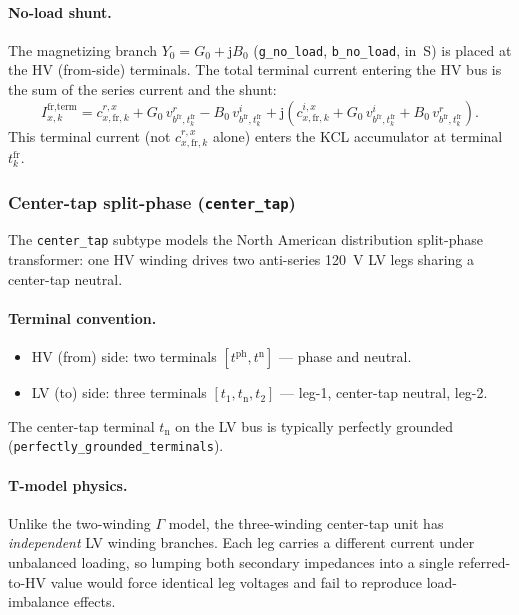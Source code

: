 \documentclass[11pt,a4paper]{article}
\newcommand{\vr}[2]{v^r_{#1,#2}}
\newcommand{\vi}[2]{v^i_{#1,#2}}
\begin{document}
\paragraph{No-load shunt.}
The magnetizing branch $Y_0 = G_0 + \mathrm{j}B_0$
(\texttt{g\_no\_load}, \texttt{b\_no\_load}, in~S) is placed at the HV
(from-side) terminals.  The total terminal current entering the HV bus
is the sum of the series current and the shunt:
%
\begin{equation}
  I^\text{fr,term}_{x,k} = c^{r,x}_{x,\text{fr},k}
    + G_0\,\vr{b^\text{fr}}{t^\text{fr}_k}
    - B_0\,\vi{b^\text{fr}}{t^\text{fr}_k}
    + \mathrm{j}\!\left(c^{i,x}_{x,\text{fr},k}
    + G_0\,\vi{b^\text{fr}}{t^\text{fr}_k}
    + B_0\,\vr{b^\text{fr}}{t^\text{fr}_k}\right).
  \label{eq:yy-shunt}
\end{equation}
%
This terminal current (not $c^{r,x}_{x,\text{fr},k}$ alone) enters the KCL
accumulator at terminal $t^\text{fr}_k$.

\subsubsection*{Center-tap split-phase (\texttt{center\_tap})}

The \texttt{center\_tap} subtype models the North American distribution
split-phase transformer: one HV winding drives two anti-series 120~V LV legs
sharing a center-tap neutral.

\paragraph{Terminal convention.}
\begin{itemize}
  \item HV (from) side: two terminals $[t^\text{ph}, t^\text{n}]$ —
        phase and neutral.
  \item LV (to) side: three terminals $[t_1, t_\text{n}, t_2]$ —
        leg-1, center-tap neutral, leg-2.
\end{itemize}
The center-tap terminal $t_\text{n}$ on the LV bus is typically
perfectly grounded (\texttt{perfectly\_grounded\_terminals}).

\paragraph{T-model physics.}
Unlike the two-winding $\Gamma$ model, the three-winding center-tap unit has
\emph{independent} LV winding branches.  Each leg carries a different current
under unbalanced loading, so lumping both secondary impedances into a single
referred-to-HV value would force identical leg voltages and fail to reproduce
load-imbalance effects.
\end{document}

